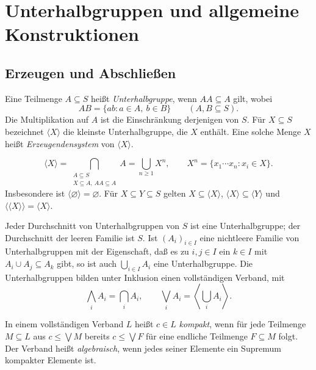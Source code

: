 \chapter{Unterhalbgruppen und allgemeine Konstruktionen}

\section{Erzeugen und Abschließen}

\begin{definition}
Eine Teilmenge $A\subseteq S$ heißt \emph{Unterhalbgruppe}, wenn
$AA\subseteq A$ gilt, wobei
\[
 AB=\{ab:a\in A,\ b\in B\}\qquad(A,B\subseteq S).
\]
Die Multiplikation auf $A$ ist die Einschränkung derjenigen von $S$.
Für $X\subseteq S$ bezeichnet $\langle X\rangle$ die kleinste
Unterhalbgruppe, die $X$ enthält. Eine solche Menge $X$ heißt
\emph{Erzeugendensystem} von $\langle X\rangle$.
\end{definition}

\begin{theorem}
\[
 \langle X\rangle
 =\bigcap_{\substack{A\subseteq S\\X\subseteq A,\ AA\subseteq A}} A
 =\bigcup_{n\geq1}X^n ,
 \qquad X^n=\{x_1\cdots x_n:x_i\in X\}.
\]
Insbesondere ist $\langle\varnothing\rangle=\varnothing$.
Für $X\subseteq Y\subseteq S$ gelten
$X\subseteq\langle X\rangle$,
$\langle X\rangle\subseteq\langle Y\rangle$ und
$\langle\langle X\rangle\rangle=\langle X\rangle$.
\cite{harju}
\end{theorem}

\begin{theorem}
Jeder Durchschnitt von Unterhalbgruppen von $S$ ist eine
Unterhalbgruppe; der Durchschnitt der leeren Familie ist $S$.
Ist $(A_i)_{i\in I}$ eine nichtleere Familie von Unterhalbgruppen
mit der Eigenschaft, daß es zu $i,j\in I$ ein $k\in I$ mit
$A_i\cup A_j\subseteq A_k$ gibt, so ist auch
$\bigcup_{i\in I}A_i$ eine Unterhalbgruppe.
Die Unterhalbgruppen bilden unter Inklusion einen vollständigen Verband,
mit
\[
 \bigwedge_i A_i=\bigcap_i A_i,\qquad
 \bigvee_i A_i=\left\langle\bigcup_i A_i\right\rangle .
\]
\cite{howie}
\end{theorem}

\begin{definition}
\label{b28guide:def:compact}
In einem vollständigen Verband $L$ heißt $c\in L$ \emph{kompakt},
wenn für jede Teilmenge $M\subseteq L$ aus $c\leq\bigvee M$ bereits
$c\leq\bigvee F$ für eine endliche Teilmenge $F\subseteq M$ folgt.
Der Verband heißt \emph{algebraisch}, wenn jedes seiner Elemente
ein Supremum kompakter Elemente ist.
\end{definition}

